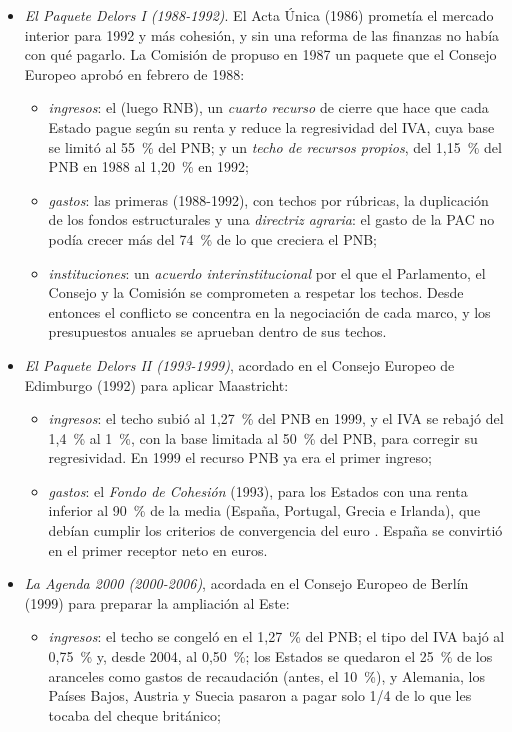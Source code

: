 \documentclass[11pt]{article}
\begin{document}
\begin{itemize}
\item \emph{El Paquete Delors I (1988-1992)}. El Acta Única (1986) prometía el mercado interior para 1992 y más cohesión, y sin una reforma de las finanzas no había con qué pagarlo. La Comisión de  propuso en 1987 un paquete que el Consejo Europeo aprobó en febrero de 1988:
  \begin{itemize}
  \item \emph{ingresos}: el  (luego RNB), un \emph{cuarto recurso} de cierre que hace que cada Estado pague según su renta y reduce la regresividad del IVA, cuya base se limitó al 55~\% del PNB; y un \emph{techo de recursos propios}, del 1,15~\% del PNB en 1988 al 1,20~\% en 1992;
  \item \emph{gastos}: las primeras  (1988-1992), con techos por rúbricas, la duplicación de los fondos estructurales y una \emph{directriz agraria}: el gasto de la PAC no podía crecer más del 74~\% de lo que creciera el PNB;
  \item \emph{instituciones}: un \emph{acuerdo interinstitucional} por el que el Parlamento, el Consejo y la Comisión se comprometen a respetar los techos. Desde entonces el conflicto se concentra en la negociación de cada marco, y los presupuestos anuales se aprueban dentro de sus techos.
  \end{itemize}
\item \emph{El Paquete Delors II (1993-1999)}, acordado en el Consejo Europeo de Edimburgo (1992) para aplicar Maastricht:
  \begin{itemize}
  \item \emph{ingresos}: el techo subió al 1,27~\% del PNB en 1999, y el IVA se rebajó del 1,4~\% al 1~\%, con la base limitada al 50~\% del PNB, para corregir su regresividad. En 1999 el recurso PNB ya era el primer ingreso;
  \item \emph{gastos}: el \emph{Fondo de Cohesión} (1993), para los Estados con una renta inferior al 90~\% de la media (España, Portugal, Grecia e Irlanda), que debían cumplir los criterios de convergencia del euro . España se convirtió en el primer receptor neto en euros.
  \end{itemize}
\item \emph{La Agenda 2000 (2000-2006)}, acordada en el Consejo Europeo de Berlín (1999) para preparar la ampliación al Este:
  \begin{itemize}
  \item \emph{ingresos}: el techo se congeló en el 1,27~\% del PNB; el tipo del IVA bajó al 0,75~\% y, desde 2004, al 0,50~\%; los Estados se quedaron el 25~\% de los aranceles como gastos de recaudación (antes, el 10~\%), y Alemania, los Países Bajos, Austria y Suecia pasaron a pagar solo 1/4 de lo que les tocaba del cheque británico;

\end{itemize}
\end{itemize}
\end{document}
